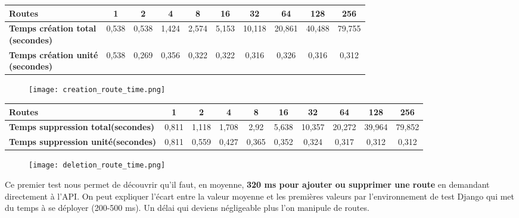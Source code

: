 \begin{footnotesize}
\small
\centerline{}
\begin{tabular}{ | M{2cm} || c | c | c | c | c |c | c | c | c | }
 \hline
\textbf{Routes} & 1 & 2 & 4 & 8 & 16 & 32 & 64 & 128 & 256\\
\hline
\textbf{Temps création total\\(secondes)} & 0,538 & 0,538 & 1,424 & 2,574 & 5,153 & 10,118 & 20,861  & 40,488 & 79,755\\
\hline
\textbf{Temps création unité\\(secondes)} & 0,538 & 0,269 & 0,356 & 0,322 & 0,322 & 0,316 & 0,326 &	0,316 &	0,312\\
\hline

\end{tabular}
\end{footnotesize}
\begin{figure}[H]
    \texttt{[image: creation\_route\_time.png]}
\end{figure}
\newpage
\begin{footnotesize}
\small
\centerline{}
\begin{tabular}{ | M{3cm} || c | c | c | c | c |c | c | c | c | }
 \hline
\textbf{Routes} & 1 & 2 & 4 & 8 & 16 & 32 & 64 & 128 & 256\\
 \hline
\textbf{Temps suppression total(secondes)} & 0,811 & 1,118 & 1,708 & 2,92 & 5,638 & 10,357 & 20,272 & 39,964 & 79,852\\
 \hline
\textbf{Temps suppression unité(secondes)} & 0,811 & 0,559 & 0,427 & 0,365 & 0,352 & 0,324 & 0,317 & 0,312 & 0,312\\
 \hline
 \end{tabular}
\end{footnotesize}

\begin{figure}[H]
    \texttt{[image: deletion\_route\_time.png]}
\end{figure}


Ce premier test nous permet de découvrir qu'il faut, en moyenne, \textbf{320 ms pour ajouter ou supprimer une route} en demandant directement à l'API.
On peut expliquer l'écart entre la valeur moyenne et les premières valeurs par l'environnement de test Django qui met du temps à se déployer (200-500 ms). Un délai qui deviens négligeable plus l'on manipule de routes.



